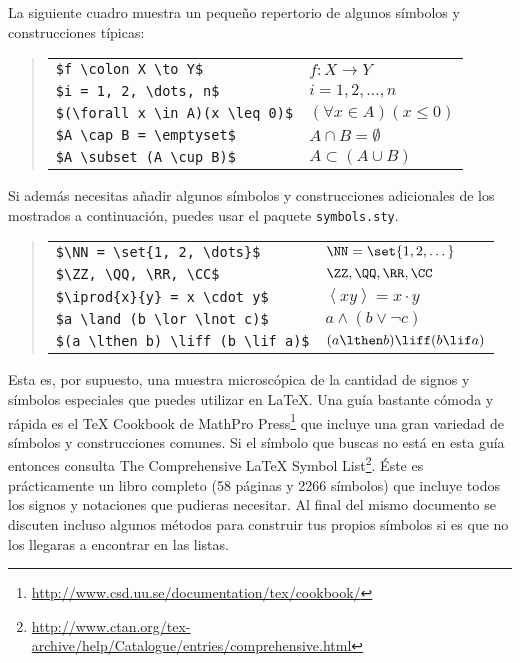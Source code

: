 La  siguiente cuadro muestra un peque\~no repertorio 
de algunos s\'imbolos y construcciones t\'ipicas:

\begin{quote}
\begin{tabular}{l@{\qquad}l}
\verb|$f \colon X \to Y$|              & $f \colon X \to Y$                \\
\verb|$i = 1, 2, \dots, n$|            & $i = 1, 2, \dots, n$              \\
\verb|$(\forall x \in A)(x \leq 0)$|   & $(\forall x \in A)(x \leq 0)$     \\
\verb|$A \cap B = \emptyset$|          & $A \cap B = \emptyset$            \\
\verb|$A \subset (A \cup B)$|          & $A \subset (A \cup B)$            \\
\end{tabular}
\end{quote}

Si adem\'as necesitas a\~nadir algunos s\'imbolos y construcciones adicionales de los mostrados a continuaci\'on, 
puedes usar el paquete \texttt{symbols.sty}.


\begin{quote}
\begin{tabular}{l@{\qquad}l}
\verb|$\NN = \set{1, 2, \dots}$|       & $\NN = \set{1, 2, \dots}$         \\
\verb|$\ZZ, \QQ, \RR, \CC$|            & $\ZZ, \QQ, \RR, \CC$              \\
\verb|$\iprod{x}{y} = x \cdot y$|      & $\left\langle{x}{y}\right\rangle = x \cdot y$  \\
\verb|$a \land (b \lor \lnot c)$|      & $a \land (b \lor \lnot c)$        \\
\verb|$(a \lthen b) \liff (b \lif a)$| & $(a \lthen b) \liff (b \lif a)$   \\
\end{tabular}
\end{quote}

Esta es, por supuesto, una muestra microsc\'opica de la cantidad de signos y s\'imbolos
especiales que puedes utilizar en \LaTeX{}. Una gu\'ia bastante c\'omoda y r\'apida es el
\TeX{} Cookbook de MathPro Press\footnote{\url{http://www.csd.uu.se/documentation/tex/cookbook/}}
que incluye una gran variedad de s\'imbolos y construcciones comunes. Si el s\'imbolo
que buscas no est\'a en esta gu\'ia entonces consulta The Comprehensive \LaTeX{} Symbol List\footnote{\url{http://www.ctan.org/tex-archive/help/Catalogue/entries/comprehensive.html}}. \'Este es
pr\'acticamente un libro completo (58 p\'aginas y 2266 s\'imbolos) que incluye todos los
signos y notaciones que pudieras necesitar. Al final del mismo documento se discuten
incluso algunos m\'etodos para construir tus propios s\'imbolos si es que no los 
llegaras a encontrar en las listas.


